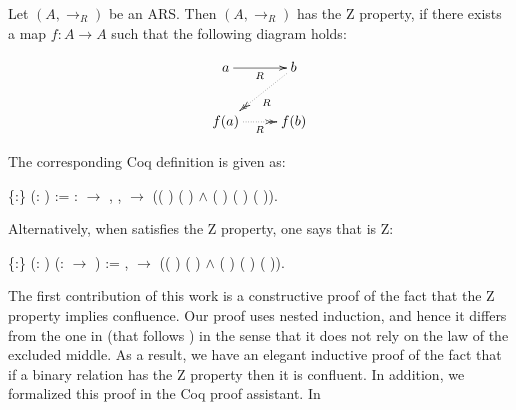     \begin{definition} Let $(A,\to_R)$ be an ARS. Then $(A,\to_R)$
      has the Z property, if there exists a map $f:A \to A$ such that
      the following diagram holds:
    
      \[ \xymatrix{ a \ar[r]_R & b \ar@{.>>}[dl]^R\\ f(a)
      \ar@{.>>}[r]_R & f(b) \\ } \] \end{definition}


The corresponding Coq definition is given as: \begin{coqdoccode}
\coqdocemptyline
\coqdocnoindent
{}  \{:\} (:  ) := \coqdoctac{\ensuremath{\exists}} : \ensuremath{\rightarrow} , \coqdockw{\ensuremath{\forall}}  ,    \ensuremath{\rightarrow} (( )  ( ) \ensuremath{\land} ( ) ( ) ( )).\coqdoceol
\coqdocemptyline
\end{coqdoccode}
Alternatively, when  satisfies the Z property, one says that  is Z: \begin{coqdoccode}
\coqdocemptyline
\coqdocnoindent
{}  \{:\} (:  ) (:  \ensuremath{\rightarrow} ) := \coqdockw{\ensuremath{\forall}}  ,    \ensuremath{\rightarrow} (( )   ( ) \ensuremath{\land} ( ) ( ) ( )).\coqdoceol
\coqdocemptyline
\end{coqdoccode}
The first contribution of this work is a constructive proof of the
    fact that the Z property implies confluence. Our proof uses nested
    induction, and hence it differs from the one in \cite{kes09}
    (that follows \cite{ZPropertyDraft}) in the sense that it does
    not rely on the law of the excluded middle. As a result, we have
    an elegant inductive proof of the fact that if a binary relation
    has the Z property then it is confluent. In addition, we
    formalized this proof in the Coq proof assistant. In
